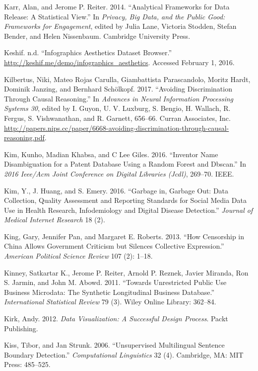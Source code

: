 \documentclass[]{krantz}
\begin{document}
\hypertarget{ref-karr2014analytical}{}
Karr, Alan, and Jerome P. Reiter. 2014. ``Analytical Frameworks for Data
Release: A Statistical View.'' In \emph{Privacy, Big Data, and the
Public Good: Frameworks for Engagement}, edited by Julia Lane, Victoria
Stodden, Stefan Bender, and Helen Nissenbaum. Cambridge University
Press.

\hypertarget{ref-harrisonweb}{}
Keshif. n.d. ``Infographics Aesthetics Dataset Browser.''
\url{http://keshif.me/demo/infographics_aesthetics}. Accessed February
1, 2016.

\hypertarget{ref-kilbertus2017}{}
Kilbertus, Niki, Mateo Rojas Carulla, Giambattista Parascandolo, Moritz
Hardt, Dominik Janzing, and Bernhard Schölkopf. 2017. ``Avoiding
Discrimination Through Causal Reasoning.'' In \emph{Advances in Neural
Information Processing Systems 30}, edited by I. Guyon, U. V. Luxburg,
S. Bengio, H. Wallach, R. Fergus, S. Vishwanathan, and R. Garnett,
656--66. Curran Associates, Inc.
\url{http://papers.nips.cc/paper/6668-avoiding-discrimination-through-causal-reasoning.pdf}.

\hypertarget{ref-kim2016inventor}{}
Kim, Kunho, Madian Khabsa, and C Lee Giles. 2016. ``Inventor Name
Disambiguation for a Patent Database Using a Random Forest and Dbscan.''
In \emph{2016 Ieee/Acm Joint Conference on Digital Libraries (Jcdl)},
269--70. IEEE.

\hypertarget{ref-Kim2016}{}
Kim, Y., J. Huang, and S. Emery. 2016. ``Garbage in, Garbage Out: Data
Collection, Quality Assessment and Reporting Standards for Social Media
Data Use in Health Research, Infodemiology and Digital Disease
Detection.'' \emph{Journal of Medical Internet Research} 18 (2).

\hypertarget{ref-King2013}{}
King, Gary, Jennifer Pan, and Margaret E. Roberts. 2013. ``How
Censorship in China Allows Government Criticism but Silences Collective
Expression.'' \emph{American Political Science Review} 107 (2): 1--18.

\hypertarget{ref-kinney2011towards}{}
Kinney, Satkartar K., Jerome P. Reiter, Arnold P. Reznek, Javier
Miranda, Ron S. Jarmin, and John M. Abowd. 2011. ``Towards Unrestricted
Public Use Business Microdata: The Synthetic Longitudinal Business
Database.'' \emph{International Statistical Review} 79 (3). Wiley Online
Library: 362--84.

\hypertarget{ref-kirk2012data}{}
Kirk, Andy. 2012. \emph{Data Visualization: A Successful Design
Process}. Packt Publishing.

\hypertarget{ref-kiss-06}{}
Kiss, Tibor, and Jan Strunk. 2006. ``Unsupervised Multilingual Sentence
Boundary Detection.'' \emph{Computational Linguistics} 32 (4).
Cambridge, MA: MIT Press: 485--525.
\end{document}
